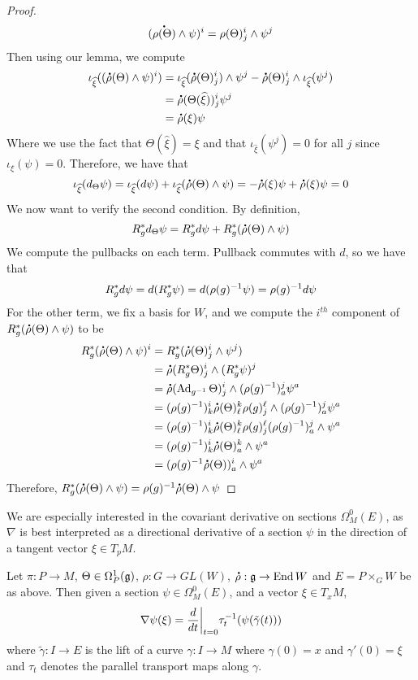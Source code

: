 \begin{proof}
\[
(\accentset{\mbox{\large\bfseries .}}{\rho(\Theta)} \wedge \psi)^i =\rho(\Theta)^i_j \wedge \psi^j
\]
Then using our lemma, we compute
\begin{align*}
\iota_{\widehat{\xi}}((\accentset{\mbox{\large\bfseries .}}{\rho}(\Theta) \wedge \psi)^i) &=
\iota_{\widehat{\xi}}(\accentset{\mbox{\large\bfseries .}}{\rho}(\Theta)^i_j) \wedge \psi^j - \accentset{\mbox{\large\bfseries .}}{\rho}(\Theta)^i_j
\wedge \iota_{\widehat{\xi}}(\psi^j) \\
&= \accentset{\mbox{\large\bfseries .}}{\rho}(\Theta(\widehat{\xi}))^i_j\psi^j \\
&= \accentset{\mbox{\large\bfseries .}}{\rho}(\xi)\psi
\end{align*}
Where we use the fact that $\Theta(\widehat{\xi}) = \xi$ and that
$\iota_{\widehat{\xi}}(\psi^j) = 0$ for all $j$ since $\iota_\xi(\psi) = 0$.
Therefore, we have that
\[
\iota_{\widehat{\xi}}(d_\Theta\psi) = \iota_{\widehat{\xi}}(d\psi) +
\iota_{\widehat{\xi}}(\accentset{\mbox{\large\bfseries .}}{\rho}(\Theta) \wedge \psi) = -\accentset{\mbox{\large\bfseries .}}{\rho}(\xi)\psi
+ \accentset{\mbox{\large\bfseries .}}{\rho}(\xi)\psi = 0
\]
We now want to verify the second condition. By definition,
\[
R_g^*d_\Theta\psi = R_g^*d\psi + R_g^*(\accentset{\mbox{\large\bfseries .}}{\rho}(\Theta) \wedge \psi)
\]
We compute the pullbacks on each term. Pullback commutes with $d$, so we
have that
\[
R_g^*d\psi = d(R^*_g\psi) = d(\rho(g)^{-1}\psi) = \rho(g)^{-1} d\psi
\]
For the other term, we fix a basis for $W$, and we compute
the $i^{th}$ component of $R_g^*(\accentset{\mbox{\large\bfseries .}}{\rho}(\Theta) \wedge \psi)$ to be
\begin{align*}
R_g^*(\accentset{\mbox{\large\bfseries .}}{\rho}(\Theta) \wedge \psi)^i
&= R^*_g(\accentset{\mbox{\large\bfseries .}}{\rho}(\Theta)^i_j \wedge \psi^j) \\
&= \accentset{\mbox{\large\bfseries .}}{\rho}(R_g^*\Theta)^i_j \wedge (R^*_g\psi)^j \\
&= \accentset{\mbox{\large\bfseries .}}{\rho}(\operatorname{Ad}_{g^{-1}}\Theta)^i_j \wedge (\rho(g)^{-1})^j_a\psi^a \\
&= (\rho(g)^{-1})^i_k\accentset{\mbox{\large\bfseries .}}{\rho}(\Theta)^k_\ell\rho(g)^\ell_j
\wedge (\rho(g)^{-1})^j_a\psi^a \\
&= (\rho(g)^{-1})^i_k\accentset{\mbox{\large\bfseries .}}{\rho}(\Theta)^k_\ell\rho(g)^\ell_j(\rho(g)^{-1})^j_a
\wedge \psi^a \\
&= (\rho(g)^{-1})^i_k\accentset{\mbox{\large\bfseries .}}{\rho}(\Theta)^k_a \wedge \psi^a \\
&= (\rho(g)^{-1}\accentset{\mbox{\large\bfseries .}}{\rho}(\Theta))^i_a \wedge \psi^a \\
\end{align*}
Therefore, $R_g^*(\accentset{\mbox{\large\bfseries .}}{\rho}(\Theta) \wedge \psi) =
\rho(g)^{-1} \accentset{\mbox{\large\bfseries .}}{\rho}(\Theta) \wedge \psi$
\end{proof}
%
We are especially interested in the covariant derivative on sections
$\Omega^0_M(E)$, as $\nabla$ is best interpreted as a directional derivative
of a section $\psi$ in the direction of a tangent vector $\xi \in T_pM$.
%
\begin{prop}
Let $\pi : P \to M$, $\Theta \in \Omega^1_P(\mathfrak{g})$, $\rho : G \to GL(W)$,
$\accentset{\mbox{\large\bfseries .}}{\rho} : \mathfrak{g} \to \operatorname{End} W$ and $E = P \times_G W$ be as above. Then given a
section $\psi \in \Omega_M^0(E)$, and a vector $\xi \in T_xM$,
\[
\nabla\psi(\xi) = \frac{d}{dt}\bigg\vert_{t = 0} \tau_t^{-1}(\psi(\tilde{\gamma}(t)))
\]
where $\tilde{\gamma} : I \to E$ is the lift of a curve $\gamma :I \to M$
where $\gamma(0) = x$ and $\gamma'(0) = \xi$ and $\tau_t$ denotes the parallel
transport maps along $\gamma$.
\end{prop}
